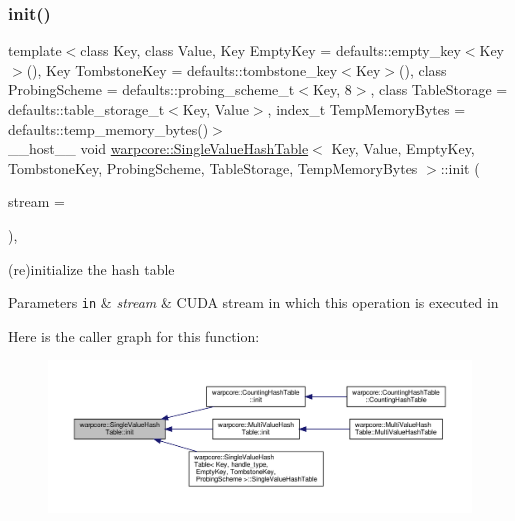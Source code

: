 \subsubsection{\texorpdfstring{init()}{init()}}
{\footnotesize\ttfamily template$<$class Key, class Value, Key Empty\+Key = defaults\+::empty\+\_\+key$<$\+Key$>$(), Key Tombstone\+Key = defaults\+::tombstone\+\_\+key$<$\+Key$>$(), class Probing\+Scheme = defaults\+::probing\+\_\+scheme\+\_\+t$<$\+Key, 8$>$, class Table\+Storage = defaults\+::table\+\_\+storage\+\_\+t$<$\+Key, Value$>$, index\+\_\+t Temp\+Memory\+Bytes = defaults\+::temp\+\_\+memory\+\_\+bytes()$>$ \\
\+\_\+\+\_\+host\+\_\+\+\_\+ void \hyperlink{classwarpcore_1_1SingleValueHashTable}{warpcore\+::\+Single\+Value\+Hash\+Table}$<$ Key, Value, Empty\+Key, Tombstone\+Key, Probing\+Scheme, Table\+Storage, Temp\+Memory\+Bytes $>$\+::init (\begin{DoxyParamCaption}\item[{cuda\+Stream\+\_\+t}]{stream = {} }\end{DoxyParamCaption})\hspace{0.3cm}{\ttfamily [inline]}, {\ttfamily [noexcept]}}



(re)initialize the hash table 


\begin{DoxyParams}[1]{Parameters}
\mbox{\tt in}  & {\em stream} & C\+U\+DA stream in which this operation is executed in \\
\hline
\end{DoxyParams}
Here is the caller graph for this function\+:
\nopagebreak
\begin{figure}[H]
\begin{center}
\leavevmode
\includegraphics[width=350pt]{classwarpcore_1_1SingleValueHashTable_a6684c95a43e912c1b0e41a6e81afb641_icgraph}
\end{center}
\end{figure}
\mbox{\label{classwarpcore_1_1SingleValueHashTable_ad7a6dfc1bef70e3c7aa02de3a684599a}} 
